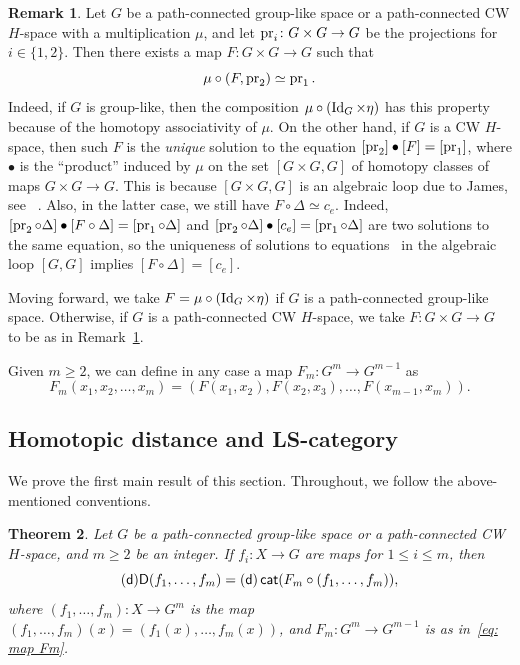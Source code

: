 \documentclass[amscd,amssymb,verbatim,10pt]{amsart}
\numberwithin{equation}{section}
\theoremstyle{plain}
\newtheorem{theorem}{Theorem}[section]
\theoremstyle{definition}
\newtheorem{remark}[theorem]{Remark}
\DeclareMathOperator{\cat}{{\mathsf{cat}}}
\def\id{\protect\operatorname{Id}}
\def\pr{\protect\operatorname{pr}}
\newcommand{\D}{{\sf {D}}}
\newcommand{\sd}{{(\sf {d})}}
\begin{document}
\begin{remark}\label{rem: map F}
Let $G$ be a path-connected group-like space or a path-connected  CW $H$-space with a multiplication $\mu$, and let $\pr_i\colon G\times G\to G$ be the projections for $i\in\{1,2\}$. Then there exists a map $F\colon G\times G\to G$ such that 
\[
\mu\circ (F,\pr_2)\simeq \pr_1.
\]
Indeed, if $G$ is group-like, then the composition $\mu\circ (\id_G\times\eta)$ has this property because of the homotopy associativity of $\mu$. On the other hand, if $G$ is a CW $H$-space, then such $F$ is the \emph{unique} solution to the equation $[\pr_2]\bullet[F]=[\pr_1]$, where $\bullet$ is the ``product'' induced by $\mu$ on the set $[G\times G,G]$ of homotopy classes of maps $G\times G\to G$. This is because $[G\times G,G]$ is an algebraic loop due to James, see ~\cite{James loop}. Also, in the latter case, we still have $F\circ\Delta\simeq c_e$. Indeed, $[\pr_2\circ\Delta]\bullet[F\circ \Delta]=[\pr_1\circ\Delta]$ and $[\pr_2\circ\Delta]\bullet[c_e]=[\pr_1\circ\Delta]$ are two solutions to the same equation, so the uniqueness of solutions to equations~\cite{James loop} in the algebraic loop $[G,G]$ implies $[F\circ\Delta]=[c_e]$. 
\end{remark}


Moving forward, we take $F=\mu\circ (\id_G\times\eta)$ if $G$ is a path-connected group-like space. Otherwise, if $G$ is a path-connected  CW $H$-space, we take $F\colon G\times G\to G$ to be as in Remark~\ref{rem: map F}. 

Given $m\ge 2$, we can define in any case a map $F_m\colon G^m\to G^{m-1}$ as 
\begin{equation}\label{eq: map Fm}
F_m(x_1,x_2,\dots,x_m)=(F(x_1,x_2),F(x_2,x_3),\dots, F(x_{m-1},x_m)).
\end{equation}

\subsection{Homotopic distance and LS-category}\label{subsec: dist as cat}
We prove the first main result of this section. Throughout, we follow the above-mentioned conventions.

\begin{theorem}\label{thm: main1}
    Let $G$ be a path-connected group-like space or a path-connected CW $H$-space, and $m\ge 2$ be an integer. If $f_i\colon X\to G$ are maps for $1\le i \le m$, then 
    \[
    \sd\D(f_1,\dots,f_m)=\sd\cat(F_m\circ (f_1,\dots,f_m)),
    \]
    where $(f_1,\dots,f_m)\colon X\to G^m$ is the map $(f_1,\dots,f_m)(x)=
(f_1(x),\dots,f_m(x))$, and $F_m\colon G^m\to G^{m-1}$ is as in~\eqref{eq: map Fm}.
\end{theorem}
\end{document}

